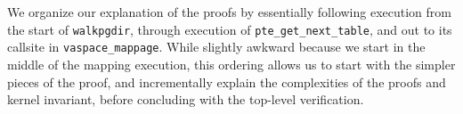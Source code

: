 We organize our explanation of the proofs by essentially following execution from the start of \lstinline|walkpgdir|, through
execution of \lstinline|pte_get_next_table|, and out to its callsite in \lstinline|vaspace_mappage|.
While slightly awkward because we start in the middle of the mapping execution,
this ordering allows us to start with the simpler pieces of the proof, and incrementally explain the complexities
of the proofs and kernel invariant, before concluding with the top-level verification.






